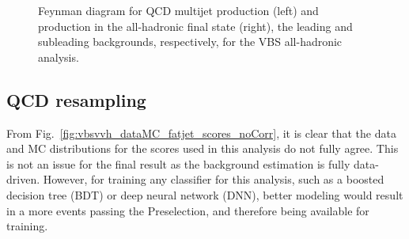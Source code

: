 \begin{figure}[htb]
    \centering
    \quad
    \caption[Feynman diagrams for QCD multijet and \ttbar production]{
        Feynman diagram for QCD multijet production (left) and \ttbar production in the all-hadronic final state (right), the leading and subleading backgrounds, respectively, for the VBS \VVH all-hadronic analysis. 
    }
    \label{fig:vbsvvh_bkgs} %
\end{figure}

\subsection{QCD \ParticleNet resampling}
From Fig.~\ref{fig:vbsvvh_dataMC_fatjet_scores_noCorr}, it is clear that the data and MC distributions for the \ParticleNet scores used in this analysis do not fully agree. 
This is not an issue for the final result as the background estimation is fully data-driven. 
However, for training any classifier for this analysis, such as a boosted decision tree (BDT) or deep neural network (DNN), better modeling would result in a more events passing the Preselection, and therefore being available for training.

